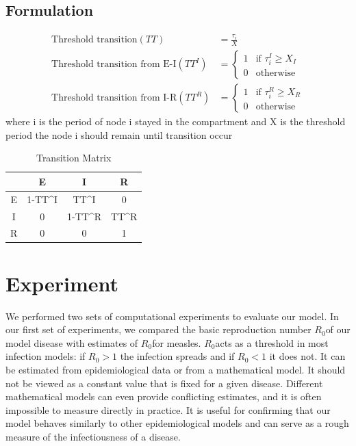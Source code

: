 \documentclass[conference]{IEEEtran}
\newcommand{\ro}{$R_0$}
\begin{document}
\subsection{Formulation}
\begin{align*}
    \text{Threshold transition}(TT) &= \frac{\tau_{i}}{X}\\
    \text{Threshold transition from E-I}(TT^{I}) &=%
    \begin{cases}
    1 &\text{if } \tau_{i}^{I} \geq X_{I}\\
    0 &\text{otherwise}
    \end{cases}\\
    \text{Threshold transition from I-R}(TT^{R}) &=%
    \begin{cases}
    1 &\text{if } \tau_{i}^{R} \geq X_{R}\\
    0 &\text{otherwise}
    \end{cases}
\end{align*}
where i is the period of node i stayed in the compartment and X is the threshold period the node i should remain until transition occur
\begin{table}[t]
    \centering
   \begin{tabular}{|C | C | C | C |}
        \hline
        \hphantom{ } & E & I & R\\
        \hline
        E &  1-TT^{I} & TT^{I} & 0\\
        \hline
        I &  0 & 1-TT^{R} & TT^{R}\\
        \hline
        R &  0 & 0 & 1\\
        \hline
   \end{tabular}
    \caption{Transition Matrix}
    \label{tab:trans_matrix}
\end{table}

\section{Experiment} %
We performed two sets of computational experiments to evaluate our model. In our first set of experiments, we compared the basic reproduction number \ro of our model disease with estimates of \ro for measles. \ro acts as a threshold in most infection models: if $R_0 > 1$ the infection spreads and if $R_0 < 1$ it does not. It can be estimated from epidemiological data or from a mathematical model. It should not be viewed as a constant value that is fixed for a given disease. Different mathematical models can even provide conflicting estimates, and it is often impossible to measure directly in practice.\cite{Li2011TheFO} It is useful for confirming that our model behaves similarly to other epidemiological models and can serve as a rough measure of the infectiousness of a disease.
\end{document}

